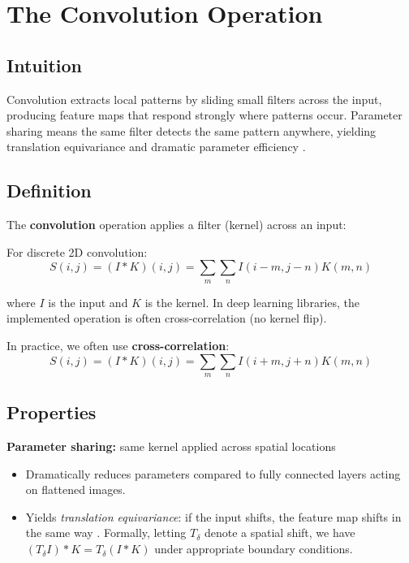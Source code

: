
\section{The Convolution Operation}
\label{sec:convolution}


\subsection*{Intuition}
Convolution extracts local patterns by sliding small filters across the input, producing feature maps that respond strongly where patterns occur. Parameter sharing means the same filter detects the same pattern anywhere, yielding translation equivariance  and dramatic parameter efficiency \cite{GoodfellowEtAl2016,Prince2023}.

\subsection{Definition}

The \textbf{convolution} operation applies a filter (kernel) across an input:

For discrete 2D convolution:
\begin{equation}
S(i,j) = (I * K)(i,j) = \sum_m \sum_n I(i-m, j-n) K(m, n)
\end{equation}

where $I$ is the input and $K$ is the kernel. In deep learning libraries, the implemented operation is often cross-correlation (no kernel flip).

In practice, we often use \textbf{cross-correlation}:
\begin{equation}
S(i,j) = (I * K)(i,j) = \sum_m \sum_n I(i+m, j+n) K(m, n)
\end{equation}

\subsection{Properties}

\textbf{Parameter sharing:} same kernel applied across spatial locations
\begin{itemize}
    \item Dramatically reduces parameters compared to fully connected layers acting on flattened images.
    \item Yields \emph{translation equivariance}: if the input shifts, the feature map shifts in the same way \cite{GoodfellowEtAl2016,Prince2023}. Formally, letting \(T_\delta\) denote a spatial shift, we have \((T_\delta I) * K = T_\delta (I * K)\) under appropriate boundary conditions.
\end{itemize}

